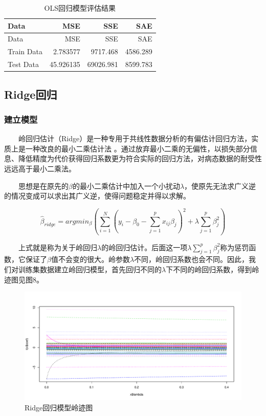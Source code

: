\documentclass[
]{article}
\begin{document}
\begin{longtable}[]{@{}lrrr@{}}
\caption{OLS回归模型评估结果}\tabularnewline
\toprule
Data & MSE & SSE & SAE\tabularnewline
\midrule
\endfirsthead
\toprule
Data & MSE & SSE & SAE\tabularnewline
\midrule
\endhead
Train Data & 2.783577 & 9717.468 & 4586.289\tabularnewline
Test Data & 45.926135 & 69026.981 & 8599.783\tabularnewline
\bottomrule
\end{longtable}

\hypertarget{ridgeux56deux5f52}{%
\subsection{Ridge回归}\label{ridgeux56deux5f52}}

\hypertarget{ux5efaux7acbux6a21ux578b}{%
\subsubsection{建立模型}\label{ux5efaux7acbux6a21ux578b}}

  岭回归估计（Ridge）是一种专用于共线性数据分析的有偏估计回归方法，实质上是一种改良的最小二乘估计法
。通过放弃最小二乘的无偏性，以损失部分信息、降低精度为代价获得回归系数更为符合实际的回归方法，对病态数据的耐受性远远高于最小二乘法。

  思想是在原先的\(\beta\)的最小二乘估计中加入一个小扰动\(\lambda\)，使原先无法求广义逆的情况变成可以求出其广义逆，使得问题稳定并得以求解。

\[\hat{\beta}_{ridge}=arg min_{\beta}\left(\sum_{i=1}^N(y_i-\beta_0-\sum_{j=1}^px_{ij}\beta_j)^2+\lambda\sum_{j=1}^p\beta_j^2\right)\]

  上式就是称为关于岭回归\(\lambda\)的岭回归估计。后面这一项\(\lambda\sum_{j=1}^p\beta_j^2\)称为惩罚函数，它保证了\(\beta\)值不会变的很大。岭参数\(\lambda\)不同，岭回归系数也会不同。因此，我们对训练集数据建立岭回归模型，首先回归不同的\(\lambda\)下不同的岭回归系数，得到岭迹图见图8。

\begin{figure}

{\centering \includegraphics{TJRJCP_DuXingx_202105_files/figure-latex/unnamed-chunk-21-1} 

}

\caption{Ridge回归模型岭迹图}\label{fig:unnamed-chunk-21}
\end{figure}
\end{document}
